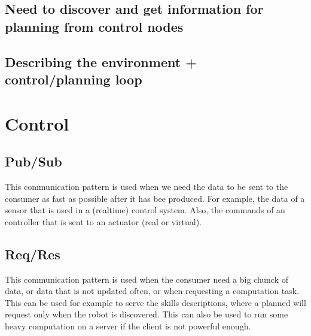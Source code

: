 \documentclass[conference]{IEEEtran}
\begin{document}
\subsection{Need to discover and get information for planning from control nodes}
\subsection{Describing the environment + control/planning loop}

\section{Control}

\subsection{Pub/Sub}

This communication pattern is used when we need the data to be sent to the consumer as fast as possible after it has bee produced.
For example, the data of a sensor that is used in a (realtime) control system.
Also, the commands of an controller that is sent to an actuator (real or virtual).

\subsection{Req/Res}

This communication pattern is used when the consumer need a big chunck of data, or data that is not updated often, or when requesting a computation task.
This can be used for example to serve the skills descriptions, where a planned will request only when the robot is discovered.
This can also be used to run some heavy computation on a server if the client is not powerful enough.

\end{document}
